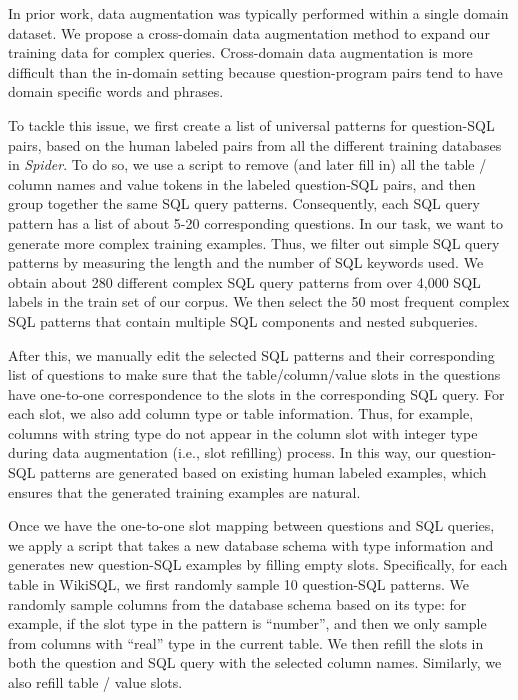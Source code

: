 \documentclass[11pt,a4paper]{article}
\begin{document}
In prior work, data augmentation was typically performed within a single domain dataset.
We propose a cross-domain data augmentation method to expand our training data for complex queries.
Cross-domain data augmentation is more difficult than the in-domain setting because question-program pairs tend to have domain specific words and phrases.

To tackle this issue, we first create a list of universal patterns for question-SQL pairs, based on the human labeled pairs from all the different training databases in \textit{Spider}.
To do so, we use a script to remove (and later fill in) all the table \!/\! column names and value tokens in the labeled question-SQL pairs, and then group together the same SQL query patterns.
Consequently, each SQL query pattern has a list of about 5-20 corresponding questions.
In our task, we want to generate more complex training examples.
Thus, we filter out simple SQL query patterns by measuring the length and the number of SQL keywords used.
We obtain about 280 different complex SQL query patterns from over 4,000 SQL labels in the train set of our corpus. We then select the 50 most frequent complex SQL patterns that contain multiple SQL components and nested subqueries. 

After this, we manually edit the selected SQL patterns and their corresponding list of questions to make sure that the table/column/value slots in the questions have one-to-one correspondence to the slots in the corresponding SQL query. For each slot, we also add column type or table information. Thus, for example, columns with string type do not appear in the column slot with integer type during data augmentation (i.e., slot refilling) process.
In this way, our question-SQL patterns are generated based on existing human labeled examples, which ensures that the generated training examples are natural.


Once we have the one-to-one slot mapping between questions and SQL queries, we apply a script that takes a new database schema with type information and generates new question-SQL examples by filling empty slots.
Specifically, for each table in WikiSQL, we first randomly sample 10 question-SQL patterns.
We randomly sample columns from the database schema based on its type: for example, if the slot type in the pattern is ``number'', and then we only sample from columns with ``real'' type in the current table.
We then refill the slots in both the question and SQL query with the selected column names.
Similarly, we also refill table \!/\! value slots.
\end{document}
